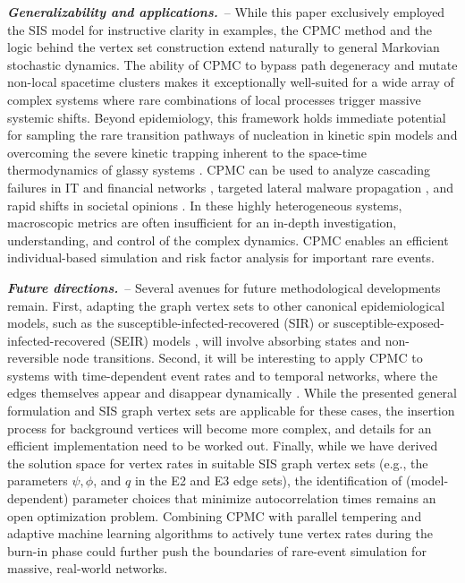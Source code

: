 \documentclass[english,10pt,aps,pra,twocolumn,superscriptaddress,floatfix,fleqn]{revtex4-2}
\newcommand{\Emph}[1]{\emph{\textbf{#1}}}
\begin{document}
\Emph{Generalizability and applications.}~-- 
While this paper exclusively employed the SIS model for instructive clarity in examples, the CPMC method and the logic behind the vertex set construction extend naturally to general Markovian stochastic dynamics. The ability of CPMC to bypass path degeneracy and mutate non-local spacetime clusters makes it exceptionally well-suited for a wide array of complex systems where rare combinations of local processes trigger massive systemic shifts.
Beyond epidemiology, this framework holds immediate potential for sampling the rare transition pathways of nucleation in kinetic spin models \cite{Binder1987-50,Rikvold1994-49} and overcoming the severe kinetic trapping inherent to the space-time thermodynamics of glassy systems \cite{Garrahan2007-98,Chandler2010-61}. CPMC can be used to analyze cascading failures in IT and financial networks \cite{Albert2000-406,Acemoglu2015-105}, targeted lateral malware propagation \cite{Newman2002-66}, and rapid shifts in societal opinions \cite{Castellano2009-81,Watts2002-99}. In these highly heterogeneous systems, macroscopic metrics are often insufficient for an in-depth investigation, understanding, and control of the complex dynamics. CPMC enables an efficient individual-based simulation and risk factor analysis for important rare events.

\Emph{Future directions.}~-- 
Several avenues for future methodological developments remain. First, adapting the graph vertex sets to other canonical epidemiological models, such as the susceptible-infected-recovered (SIR) or susceptible-exposed-infected-recovered (SEIR) models \cite{PastorSatorras2015-87}, will involve absorbing states and non-reversible node transitions. Second, it will be interesting to apply CPMC to systems with time-dependent event rates and to temporal networks, where the edges themselves appear and disappear dynamically \cite{Holme2012-519}. While the presented general formulation and SIS graph vertex sets are applicable for these cases, the insertion process for background vertices will become more complex, and details for an efficient implementation need to be worked out. Finally, while we have derived the solution space for vertex rates in suitable SIS graph vertex sets (e.g., the parameters $\psi, \phi$, and $q$ in the \textsc{E2} and \textsc{E3} edge sets), the identification of (model-dependent) parameter choices that minimize autocorrelation times remains an open optimization problem. Combining CPMC with parallel tempering \cite{Note4} and adaptive machine learning algorithms to actively tune vertex rates during the burn-in phase could further push the boundaries of rare-event simulation for massive, real-world networks.
\end{document}
